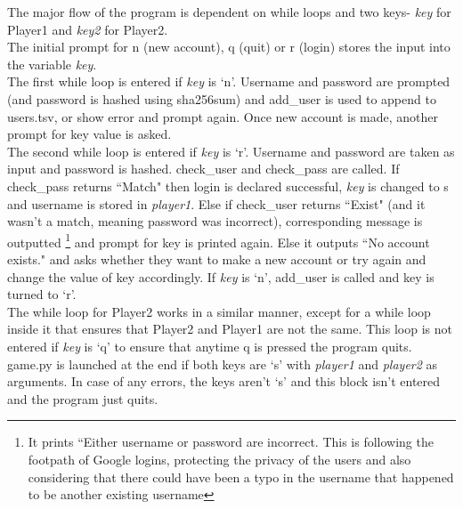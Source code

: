 \documentclass[12pt]{article}
\begin{document}
\indent The major flow of the program is dependent on while loops and two keys- \textit{key} for Player1 and \textit{key2} for Player2. \\ 
\indent The initial prompt for n (new account), q (quit) or r (login) stores the input into the variable \textit{key}. \\
\indent The first while loop is entered if \textit{key} is `n'. Username and password are prompted (and password is hashed using sha256sum) and add\_user is used to append to users.tsv, or show error and prompt again. Once new account is made, another prompt for key value is asked. \\
\indent The second while loop is entered if \textit{key} is `r'. Username and password are taken as input and password is hashed. check\_user and check\_pass are called. If check\_pass returns ``Match" then login is declared successful, \textit{key} is changed to s and username is stored in \textit{player1}. Else if check\_user returns ``Exist" (and it wasn't a match, meaning password was incorrect), corresponding message is outputted \footnote {It prints ``Either username or password are incorrect. This is following the footpath of Google logins, protecting the privacy of the users and also considering that there could have been a typo in the username that happened to be another existing username} and prompt for key is printed again. 
Else it outputs ``No account exists." and asks whether they want to make a new account or try again and change the value of key accordingly. If \textit{key} is `n', add\_user is called and key is turned to `r'. \\
\indent The while loop for Player2 works in a similar manner, except for a while loop inside it that ensures that Player2 and Player1 are not the same. This loop is not entered if \textit{key} is `q' to ensure that anytime q is pressed the program quits.  \\
\indent game.py is launched at the end if both keys are `s' with \textit{player1} and \textit{player2} as arguments. In case of any errors, the keys aren't `s' and this block isn't entered and the program just quits. 
\end{document}
